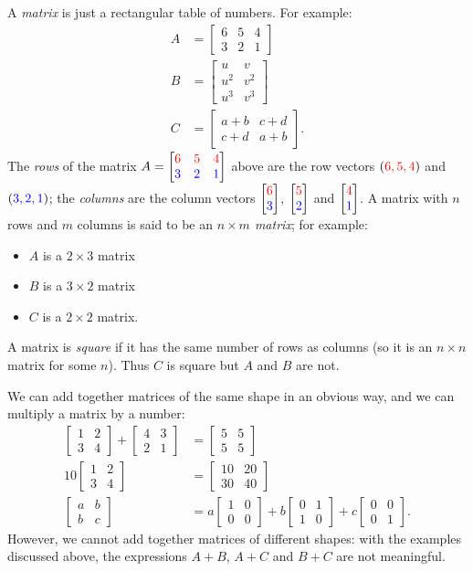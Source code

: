\documentclass[a4paper]{book}
\newcommand{\RED}[1]{{\color{red}#1}}
\newcommand{\BLUE}[1]{{\color{blue}#1}}
\newcommand{\PURPLE}[1]{{\color{purple}#1}}
\newcommand{\bbm}       {\begin{bmatrix}}
\newcommand{\ebm}       {\end{bmatrix}}
\newcommand{\tm}        {\times}
\renewcommand{\:}{\colon}
\newcommand{\DEFN}[1]{\PURPLE{\emph{#1}}}
\theoremstyle{definition}
\begin{document}
A \DEFN{matrix} is just a rectangular table of numbers.  For example:
\begin{align*}
 A &= \bbm 6 & 5 & 4 \\ 3 & 2 & 1 \ebm \\
 B &= \bbm u & v \\ u^2 & v^2 \\ u^3 & v^3 \ebm \\
 C &= \bbm a+b & c+d \\ c+d & a+b \ebm.
\end{align*}
The \DEFN{rows} of the matrix 
$A = \bbm \RED{6} & \RED{5} & \RED{4} \\
          \BLUE{3} & \BLUE{2} & \BLUE{1} 
\ebm$
above are the row vectors $(\RED{6,5,4})$ and $(\BLUE{3,2,1})$; the
\DEFN{columns} are the column vectors $\bbm\RED{6}\\\BLUE{3}\ebm$,
$\bbm\RED{5}\\\BLUE{2}\ebm$ and $\bbm\RED{4}\\\BLUE{1}\ebm$.  A matrix
with $n$ rows and $m$ columns is said to be an \DEFN{$n\tm m$ matrix};
for example:
\begin{itemize}
 \item $A$ is a $2\tm 3$ matrix
 \item $B$ is a $3\tm 2$ matrix
 \item $C$ is a $2\tm 2$ matrix.
\end{itemize}
A matrix is \DEFN{square} if it has the same number of rows as columns
(so it is an $n\tm n$ matrix for some $n$).  Thus $C$ is square but
$A$ and $B$ are not.

We can add together matrices of the same shape in an obvious way, and
we can multiply a matrix by a number:
\begin{align*}
 \bbm 1 & 2 \\ 3 & 4 \ebm + 
 \bbm 4 & 3 \\ 2 & 1 \ebm &= 
 \bbm 5 & 5 \\ 5 & 5 \ebm \\
 10 \bbm 1 & 2 \\ 3 & 4 \ebm  &= 
 \bbm 10 & 20 \\ 30 & 40 \ebm \\
 \bbm a & b \\ b & c \ebm &= 
 a \bbm 1 & 0 \\ 0 & 0 \ebm +
 b \bbm 0 & 1 \\ 1 & 0 \ebm +
 c \bbm 0 & 0 \\ 0 & 1 \ebm.
\end{align*}
However, we cannot add together matrices of different shapes: with the
examples discussed above, the expressions $A+B$, $A+C$ and $B+C$ are
not meaningful.
\end{document}
